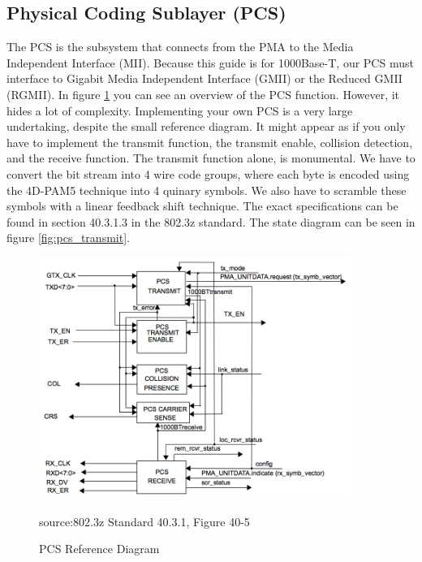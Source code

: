 \documentclass[12pt]{report}
\begin{document}
\subsection{Physical Coding Sublayer (PCS)}
The PCS is the subsystem that connects from the PMA to the Media Independent Interface (MII).
Because this guide is for 1000Base-T, our PCS must interface to Gigabit Media Independent Interface (GMII) or the Reduced GMII (RGMII).
In figure \ref{fig:pcs} you can see an overview of the PCS function. However, it hides a lot
of complexity. Implementing your own PCS is a very large undertaking,
despite the small reference diagram. It might appear as if you only have to implement
the transmit function, the transmit enable, collision detection, and the receive function.
The transmit function alone, is monumental.
We have to convert the bit stream into 4 wire code groups,
where each byte is encoded using the 4D-PAM5 technique into 4 quinary symbols.
We also have to scramble these symbols with a linear feedback shift technique.
The exact specifications can be found in section 40.3.1.3 in the 802.3z standard.
The state diagram can be seen in figure \ref{fig:pcs_transmit}.

\begin{figure}[H]
\centering
\includegraphics[width=4in]{pcs}
\caption{PCS Reference Diagram}
\small source:802.3z Standard 40.3.1, Figure 40-5 \cite{802.3z}
\label{fig:pcs}
\end{figure}
\end{document}
